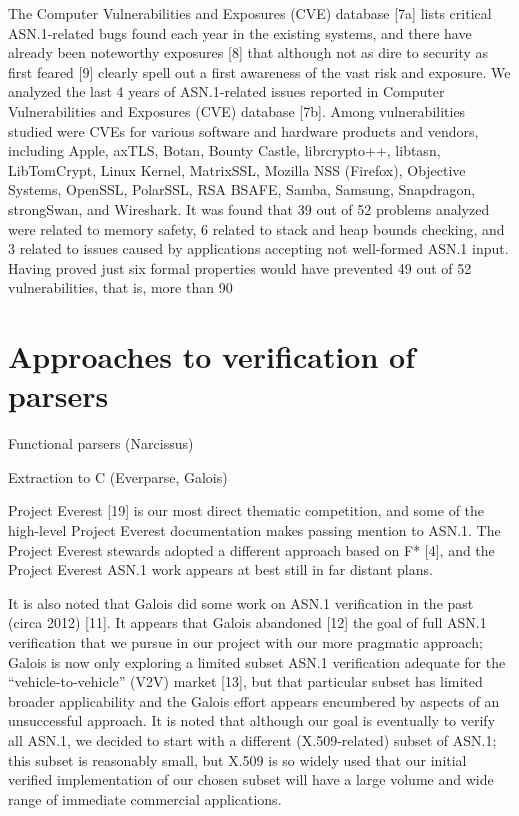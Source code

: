 \documentclass[12pt,usenames,dvipsnames]{paper}
\begin{document}
The Computer Vulnerabilities and Exposures (CVE) database [7a] lists critical ASN.1-related bugs found each year in the existing systems, and there have already been noteworthy exposures [8] that although not as dire to security as first feared [9] clearly spell out a first awareness of the vast risk and exposure. We analyzed the last 4 years of ASN.1-related issues reported in Computer Vulnerabilities and Exposures (CVE) database [7b]. Among vulnerabilities studied were CVEs for various software and hardware products and vendors, including Apple, axTLS, Botan, Bounty Castle, librcrypto++, libtasn, LibTomCrypt, Linux Kernel, MatrixSSL, Mozilla NSS (Firefox), Objective Systems, OpenSSL, PolarSSL, RSA BSAFE, Samba, Samsung, Snapdragon, strongSwan, and Wireshark. It was found that 39 out of 52 problems analyzed were related to memory safety, 6 related to stack and heap bounds checking, and 3 related to issues caused by applications accepting not well-formed ASN.1 input. Having proved just six formal properties would have prevented 49 out of 52 vulnerabilities, that is, more than 90%

\section{Approaches to verification of parsers}

  Functional parsers (Narcissus)

  Extraction to C (Everparse, Galois)

  Project Everest [19] is our most direct thematic competition, and some of the high-level Project Everest documentation makes passing mention to ASN.1. The Project Everest stewards adopted a different approach based on F* [4], and the Project Everest ASN.1 work  appears at best still in far distant plans.

It is also noted that Galois did some work on ASN.1 verification in the past (circa 2012) [11]. It appears that Galois abandoned [12] the goal of full ASN.1 verification that we pursue in our project with our more pragmatic approach; Galois is now only exploring a limited subset ASN.1 verification adequate for the “vehicle-to-vehicle” (V2V) market [13], but that particular subset has limited broader applicability and the Galois effort appears encumbered by aspects of an unsuccessful  approach. It is noted that although our goal is eventually to verify all ASN.1, we decided to start with a different (X.509-related) subset of ASN.1; this subset is reasonably small, but X.509 is so widely used that our initial verified implementation of our chosen subset will have a large volume and wide range of immediate commercial applications.
\end{document}
